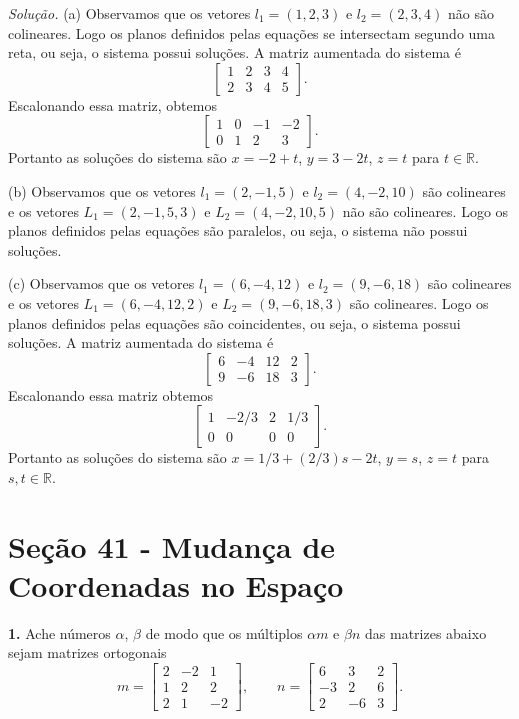 \documentclass[a4paper,11pt]{article}
\newcommand{\R}{\mathbb{R}}
\begin{document}
\vspace{\baselineskip}

\emph{Solução.}
(a)
Observamos que os vetores $l_1 = (1,2,3)$ e $l_2 = (2,3,4)$ não são colineares.
Logo os planos definidos pelas equações se intersectam segundo uma reta, ou seja, o sistema possui soluções.
A matriz aumentada do sistema é
\[
  \begin{bmatrix}
    1 & 2 & 3 & 4 \\
    2 & 3 & 4 & 5
  \end{bmatrix}.
\]
Escalonando essa matriz, obtemos
\[
  \begin{bmatrix}
    1 & 0 & -1 & -2 \\
    0 & 1 & 2 & 3
  \end{bmatrix}.
\]
Portanto as soluções do sistema são $x = -2 + t$, $y = 3 - 2t$, $z = t$ para $t \in \R$.

(b)
Observamos que os vetores $l_1 = (2,-1,5)$ e $l_2 = (4,-2,10)$ são colineares e os vetores $L_1 = (2,-1,5,3)$ e $L_2 = (4,-2,10,5)$ não são colineares.
Logo os planos definidos pelas equações são paralelos, ou seja, o sistema não possui soluções.

(c)
Observamos que os vetores $l_1 = (6,-4,12)$ e $l_2 = (9,-6,18)$ são colineares e os vetores $L_1 = (6,-4,12,2)$ e $L_2 = (9,-6,18,3)$ são colineares.
Logo os planos definidos pelas equações são coincidentes, ou seja, o sistema possui soluções.
A matriz aumentada do sistema é
\[
  \begin{bmatrix}
    6 & -4 & 12 & 2 \\
    9 & -6 & 18 & 3
  \end{bmatrix}.
\]
Escalonando essa matriz obtemos
\[
  \begin{bmatrix}
    1 & -2/3 & 2 & 1/3 \\
    0 & 0 & 0 & 0
  \end{bmatrix}.
\]
Portanto as soluções do sistema são $x = 1/3 + (2/3)s - 2t$, $y = s$, $z = t$ para $s, t \in \R$.

\section*{Seção 41 - Mudança de Coordenadas no Espaço}

\textbf{1.}
Ache números $\alpha$, $\beta$ de modo que os múltiplos $\alpha m$ e $\beta n$ das matrizes abaixo sejam matrizes ortogonais
\[
  m =
  \begin{bmatrix}
    2 & -2 & 1 \\
    1 & 2 & 2 \\
    2 & 1 & -2
  \end{bmatrix},
  \qquad n =
  \begin{bmatrix}
    6 & 3 & 2 \\
    -3 & 2 & 6 \\
    2 & -6 & 3
  \end{bmatrix}.
\]
\end{document}
